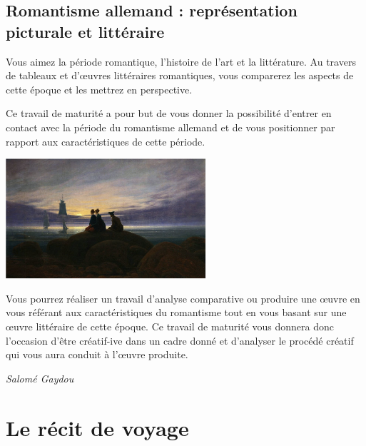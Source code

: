 \documentclass[
  10pt,
  french,
  a5paper,
  openany]{book}
\newenvironment{signature}{\begin{flushright}}{\end{flushright}}
\begin{document}
\hypertarget{romantisme-allemand-repreux301sentation-picturale-et-litteux301raire}{%
\section*{Romantisme allemand : représentation picturale et littéraire}\label{romantisme-allemand-repreux301sentation-picturale-et-litteux301raire}}

Vous aimez la période romantique, l'histoire de l'art et la littérature. Au travers de tableaux et d'œuvres littéraires romantiques, vous comparerez les aspects de cette époque et les mettrez en perspective.

Ce travail de maturité a pour but de vous donner la possibilité d'entrer en contact avec la période du romantisme allemand et de vous positionner par rapport aux caractéristiques de cette période.

\begin{center}
\includegraphics[width=\textwidth,height=12em]{images/analyse-comparative-et-ou-creation-2.jpg}

\end{center}

Vous pourrez réaliser un travail d'analyse comparative ou produire une œuvre en vous référant aux caractéristiques du romantisme tout en vous basant sur une œuvre littéraire de cette époque. Ce travail de maturité vous donnera donc l'occasion d'être créatif-ive dans un cadre donné et d'analyser le procédé créatif qui vous aura conduit à l'œuvre produite.

\begin{signature}
\emph{Salomé Gaydou}

\end{signature}

\hypertarget{le-ruxe9cit-de-voyage}{%
\chapter{Le récit de voyage}\label{le-ruxe9cit-de-voyage}}
\end{document}
